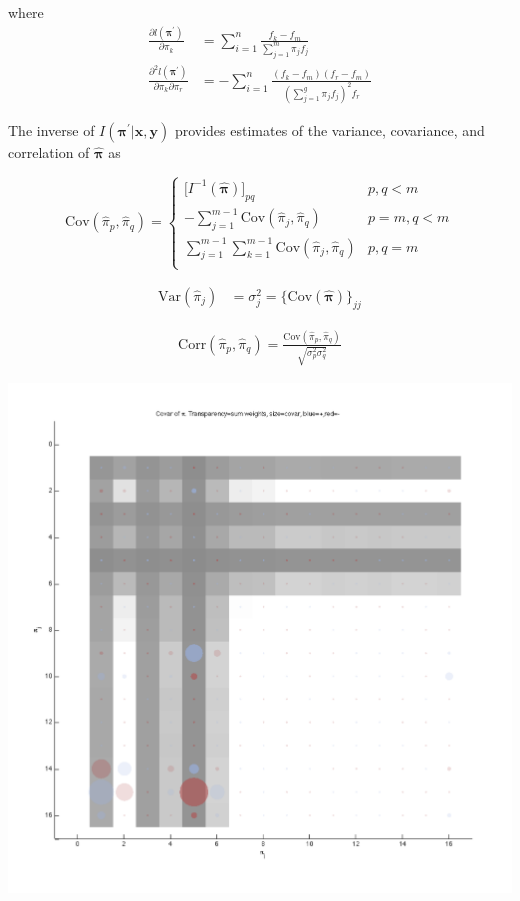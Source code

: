 \documentclass[12pt]{amsart}
\newcommand{\vect}[1]{\boldsymbol{\mathbf{#1}}}
\newcommand{\eqn}[1]{\begin{align*}
#1
\end{align*}}
\newcommand{\Bl}{\Big\{}
\newcommand{\Br}{\Big\}}
\newcommand{\mtx}[4]{
\[
#1 = #2
\left[ {\begin{array}{#3}
 #4
 \end{array} } \right]
\]
}
\newcommand{\eqnset}[4]{
\[ #1 = #2 \left\{ \begin{array}{#3}
        #4
\end{array} \right. \] 
}
\newcommand{\vx}{\vect{x}}
\newcommand{\vy}{\vect{y}}
\newcommand{\vp}{\vect{\pi}}
\newcommand{\vph}{\hat{\vect{\pi}}}
\newcommand{\llpp}{l(\vect{\pi^\prime})}
\newcommand{\hessllg}[2]{\sumn \frac{f_{#1}}{(\sumg \pi_j f_j)^2 f_{#2}}}
\newcommand{\sumn}{\sum^n_{i=1}}
\newcommand{\summ}{\sum^m_{j=1}}
\newcommand{\sumg}{\sum^g_{j=1}}
\begin{document}
where
\eqn{
	\frac{\partial \llpp}{\partial \pi_k} &= \sumn \frac{f_k - f_m}{\summ \pi_j f_j}	\\
	\frac{\partial^2 \llpp}{\partial \pi_k \partial \pi_r} &= -\sumn \frac{(f_k-f_m) (f_r-f_m)}{(\sumg \pi_j f_j)^2 f_r}
}




The inverse of $I(\vp^\prime|\vx,\vy)$ provides estimates of the variance, covariance, and correlation of $\vph$ as

\eqnset{\text{Cov}(\hat{\pi}_p,\hat{\pi}_q)}{}{ll}{
	\big[I^{-1}(\vph) \big]_{pq}				& p,q<m	\\
	-\sum\limits_{j=1}^{m-1} \text{Cov}(\hat{\pi}_j,\hat{\pi}_q)		& p=m,q<m	\\
	\sum\limits_{j=1}^{m-1} \sum\limits_{k=1}^{m-1} \text{Cov}(\hat{\pi}_j,\hat{\pi}_q)		& p, q=m	\\
}

\eqn{
	\text{Var}(\hat{\pi}_j) &= \sigma^2_j = \Bl  \text{Cov}(\vph) \Br_{jj}
}

\eqn{
	\text{Corr}(\hat{\pi}_p,\hat{\pi}_q) = \frac{\text{Cov}(\hat{\pi}_p,\hat{\pi}_q)}{\sqrt{\sigma^2_p \sigma^2_q}}
}




\begin{center}
	\includegraphics[scale=0.42]{covar.pdf}
\end{center}
\end{document}
